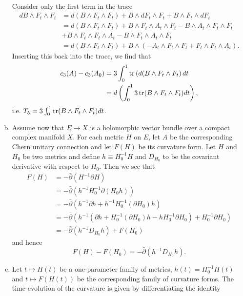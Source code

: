 \documentclass{../mathnotes}
\begin{document}
\begin{enumerate}[(a)]
\begin{align*}
        \end{align*}
        Consider only the first term in the trace
        \begin{align*}
            dB\wedge F_t\wedge F_t &= d(B\wedge F_t\wedge F_t)+B\wedge dF_t\wedge F_t+B\wedge F_t\wedge dF_t\\
            &=d(B\wedge F_t\wedge F_t)+B\wedge F_t\wedge A_t\wedge F_t-B\wedge A_t\wedge F_t\wedge F_t\\
            &+B\wedge F_t\wedge F_t\wedge A_t-B\wedge F_t\wedge A_t\wedge F_t\\
            &=d(B\wedge F_t\wedge F_t)+B\wedge\left( -A_t\wedge F_t\wedge F_t+F_t\wedge F_t\wedge A_t \right).
        \end{align*}
        Inserting this back into the trace, we find that
        \begin{align*}
            c_3(A)-c_3(A_0)&=3\int_0^1 \operatorname{tr}\left( d(B\wedge F_t\wedge F_t \right) dt\\
            &=d\left( \int_0^13\operatorname{tr}(B\wedge F_t\wedge F_t)dt \right),
        \end{align*}
        i.e. $T_5=3\int_0^1\operatorname{tr}(B\wedge F_t\wedge F_t)dt$.
    \item Assume now that $E\to X$ is a holomorphic vector bundle over a compact complex manifold $X$. For each metric $H$ on $E$,
        let $A$ be the corresponding Chern unitary connection and let $F(H)$ be its curvature form. Let $H$ and $H_0$ be two
        metrics and define $h\equiv H_0^{-1}H$ and $D_{H_0}$ to be the covariant derivative with respect to $H_0$. Then we see that
        \begin{align*}
            F(H)&=-\bar\partial\left( H^{-1}\partial H \right)\\
            &=-\bar\partial\left( h^{-1}H_0^{-1}\partial(H_0h) \right)\\
            &=-\bar\partial\left( h^{-1}\partial h+h^{-1}H_0^{-1}(\partial H_0)h \right)\\
            &=-\bar\partial\left( h^{-1}(\partial h+H_0^{-1}(\partial H_0)h-hH_0^{-1}\partial H_0)+H_0^{-1}\partial H_0 \right)\\
            &=-\bar\partial(h^{-1}D_{H_0}h)+F(H_0)
        \end{align*}
        and hence
        \[F(H)-F(H_0)=-\bar\partial(h^{-1}D_{H_0}h).\]
    \item Let $t\mapsto H(t)$ be a one-parameter family of metrics, $h(t)=H_0^{-1}H(t)$ and $t\mapsto F(H(t))$ be
        the corresponding family of curvature forms. The time-evolution of the curvature is given by differentiating the identity

\end{enumerate}
\end{document}
